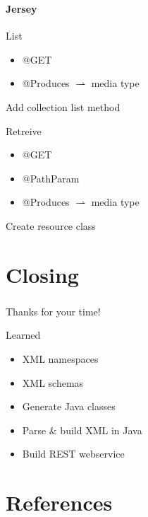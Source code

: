 \documentclass[handout]{beamer}
\begin{document}
\begin{frame}
	\frametitle{\insertsection}
	\framesubtitle{Jersey}
	\begin{block}{List}
		\begin{itemize}
			\item @GET
			\item @Produces $\rightharpoonup$ media type
		\end{itemize}
	\end{block}
	\begin{semiverbatim}
		Add collection list method
	\end{semiverbatim}
	\begin{block}{Retreive}
		\begin{itemize}
			\item @GET
			\item @PathParam
			\item @Produces $\rightharpoonup$ media type
		\end{itemize}
	\end{block}
	\begin{semiverbatim}
		Create resource class
	\end{semiverbatim}
\end{frame}

\section*{Closing}
\begin{frame}
	\frametitle{\insertsection}
	Thanks for your time!
	\begin{block}{Learned}
		\begin{itemize}
			\item XML namespaces
			\item XML schemas
			\item Generate Java classes
			\item Parse \& build XML in Java
			\item Build REST webservice
		\end{itemize}
	\end{block}
\end{frame}

\section{References}
\end{document}
